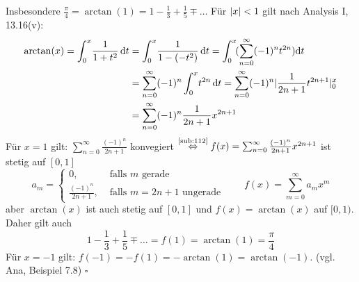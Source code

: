 \begin{enumerate}[(i)]
\[	\]
	Insbesondere $\frac{\pi }{4} = \arctan (1) = 1 - \frac{1}{3} + \frac{1}{5} \mp \ldots  $
	Für $\lvert x\rvert < 1 $ gilt nach Analysis I, 13.16(v):
	\begin{align*}
		\arctan(x) = \int_{0} ^{x} \! \frac{1}{1+t^2}  \, \mathrm{d}t &= \int_{0} ^{x} \! \frac{1}{1- (-t^2)}  \, \mathrm{d}t = \int_{0} ^{x} \! 
		(\sum_{n=0}^{\infty} (-1)^n t^{2n})  \mathrm{d}t  \\
		&= \sum_{n=0}^{\infty} (-1)^n \int_{0} ^{x} \! t^{2n}  \, \mathrm{d}t = \sum_{n=0}^{\infty} (-1)^n \lvert\frac{1}{2n+1} t^{2n+1} \rvert_0^x \\
		&= \sum_{n=0}^{\infty} (-1)^n \frac{1}{2n+1} x^{2n+1} 
	\end{align*}
	Für $x=1$ gilt: $\sum_{n=0}^{\infty} \frac{(-1)^n}{2n+1} $ konvegiert $\overset{\text{\ref{sub:112}}}{\Leftrightarrow} f(x) 
	= \sum_{n=0}^{\infty} \frac{(-1)^n}{2n+1} x^{2n+1} $ ist stetig auf $[0,1]$
	\[
		a_m = \begin{cases}
			0, &\text{ falls $m$ gerade}\\
			\frac{(-1)^n}{2n+1}, &\text{ falls } m=2n+1 \text{ ungerade} 
		\end{cases} \qquad f(x) = \sum_{m=0}^{\infty} a_m x^m
	\]
	aber $\arctan(x)$ ist auch stetig auf $[0,1]$ und $f(x)=\arctan(x)$ auf $[0,1)$. Daher gilt auch 
	\[
		1- \frac{1}{3} + \frac{1}{5} \mp \ldots  =f(1)= \arctan(1)= \frac{\pi }{4} 
	\]
	Für $x=-1$ gilt: $f(-1)= - f(1)= - \arctan(1) = \arctan (-1)$. {\footnotesize (vgl. Ana, Beispiel 7.8)} \hfill \( \square \)
\end{enumerate}

